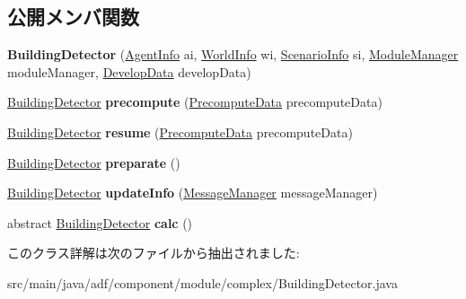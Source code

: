 \subsection*{公開メンバ関数}
\begin{DoxyCompactItemize}
\item 
\hypertarget{classadf_1_1component_1_1module_1_1complex_1_1BuildingDetector_aec293c18a386b5eb4b2790a172a4b658}{}\label{classadf_1_1component_1_1module_1_1complex_1_1BuildingDetector_aec293c18a386b5eb4b2790a172a4b658} 
{\bfseries Building\+Detector} (\hyperlink{classadf_1_1agent_1_1info_1_1AgentInfo}{Agent\+Info} ai, \hyperlink{classadf_1_1agent_1_1info_1_1WorldInfo}{World\+Info} wi, \hyperlink{classadf_1_1agent_1_1info_1_1ScenarioInfo}{Scenario\+Info} si, \hyperlink{classadf_1_1agent_1_1module_1_1ModuleManager}{Module\+Manager} module\+Manager, \hyperlink{classadf_1_1agent_1_1develop_1_1DevelopData}{Develop\+Data} develop\+Data)
\item 
\hypertarget{classadf_1_1component_1_1module_1_1complex_1_1BuildingDetector_ab2234c4c8272453eead244b01df179d3}{}\label{classadf_1_1component_1_1module_1_1complex_1_1BuildingDetector_ab2234c4c8272453eead244b01df179d3} 
\hyperlink{classadf_1_1component_1_1module_1_1complex_1_1BuildingDetector}{Building\+Detector} {\bfseries precompute} (\hyperlink{classadf_1_1agent_1_1precompute_1_1PrecomputeData}{Precompute\+Data} precompute\+Data)
\item 
\hypertarget{classadf_1_1component_1_1module_1_1complex_1_1BuildingDetector_a2f05d2f850a011165556239e27b0ac28}{}\label{classadf_1_1component_1_1module_1_1complex_1_1BuildingDetector_a2f05d2f850a011165556239e27b0ac28} 
\hyperlink{classadf_1_1component_1_1module_1_1complex_1_1BuildingDetector}{Building\+Detector} {\bfseries resume} (\hyperlink{classadf_1_1agent_1_1precompute_1_1PrecomputeData}{Precompute\+Data} precompute\+Data)
\item 
\hypertarget{classadf_1_1component_1_1module_1_1complex_1_1BuildingDetector_a335d77b425417f1c100f885e86df3854}{}\label{classadf_1_1component_1_1module_1_1complex_1_1BuildingDetector_a335d77b425417f1c100f885e86df3854} 
\hyperlink{classadf_1_1component_1_1module_1_1complex_1_1BuildingDetector}{Building\+Detector} {\bfseries preparate} ()
\item 
\hypertarget{classadf_1_1component_1_1module_1_1complex_1_1BuildingDetector_adc80809fbcc1981ee903ea82e282bf2b}{}\label{classadf_1_1component_1_1module_1_1complex_1_1BuildingDetector_adc80809fbcc1981ee903ea82e282bf2b} 
\hyperlink{classadf_1_1component_1_1module_1_1complex_1_1BuildingDetector}{Building\+Detector} {\bfseries update\+Info} (\hyperlink{classadf_1_1agent_1_1communication_1_1MessageManager}{Message\+Manager} message\+Manager)
\item 
\hypertarget{classadf_1_1component_1_1module_1_1complex_1_1BuildingDetector_a5bf336bb16e60b3c29b2d640366daf0d}{}\label{classadf_1_1component_1_1module_1_1complex_1_1BuildingDetector_a5bf336bb16e60b3c29b2d640366daf0d} 
abstract \hyperlink{classadf_1_1component_1_1module_1_1complex_1_1BuildingDetector}{Building\+Detector} {\bfseries calc} ()
\end{DoxyCompactItemize}


このクラス詳解は次のファイルから抽出されました\+:\begin{DoxyCompactItemize}
\item 
src/main/java/adf/component/module/complex/Building\+Detector.\+java\end{DoxyCompactItemize}
